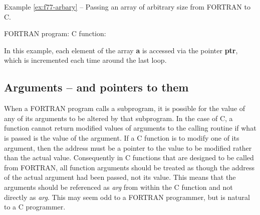 \label{ex:f77-arbary}
\begin{center}
Example \ref{ex:f77-arbary} -- Passing an array of arbitrary size from FORTRAN
to C.
\end{center}
\nopagebreak[4]
FORTRAN program:
\pagebreak[1]
C function:

In this example, each element of the array {\bf a} is accessed via the pointer
{\bf ptr}, which is incremented each time around the last loop.

\subsection{Arguments -- and pointers to them}

When a FORTRAN program calls a subprogram, it is possible for the value of any
of its arguments to be altered by that subprogram. In the case of C, a function
cannot return modified values of arguments to the calling routine if what is
passed is the value of the argument. If a C function is to modify one of its
argument, then the address must be a pointer to the value to be modified rather
than the actual value. Consequently in C functions that are designed to be
called from FORTRAN, all function arguments should be treated as though the
address of the actual argument had been passed, not its value. This means that
the arguments should be referenced as {\tt *}{\em arg} from within the C
function and not directly as {\em arg}. This may seem odd to a FORTRAN
programmer, but is natural to a C programmer. 

